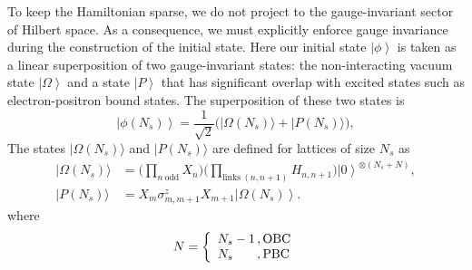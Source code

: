 \documentclass[twocolumn,superscriptaddress,showpacs,nofootinbib,notitlepage,preprintnumbers,secnumarabic,amssymb, floatfix, nobibnotes, aps, prd]{revtex4-2}
\newcommand{\ket}[1]{\left| #1 \right>} %
\begin{document}
To keep the Hamiltonian sparse, we do not project to the gauge-invariant sector of Hilbert space.  As a consequence, we must explicitly enforce gauge invariance during the construction of the initial state.
Here our initial state $\ket{\phi}$ is taken as a linear superposition of two gauge-invariant states: the non-interacting vacuum state $\ket{\Omega}$  and a state $\ket{P}$ that has significant overlap with excited states such as electron-positron bound states. The superposition of these two states is 
\begin{equation}
    \label{eq:initstate}
    \ket{\phi(N_s)} = \frac{1}{\sqrt{2}}\Big(|\Omega(N_s)\rangle + |P(N_s)\rangle\Big),
\end{equation}
The states $|\Omega(N_s)\rangle$ and $|P(N_s)\rangle$ are defined for lattices of size $N_s$ as
\begin{equation}
  \begin{split}
    \label{eq:compstates}
    |\Omega(N_s)\rangle &= \Big(\prod_{n\ \text{odd}}X_{n}\Big)\Big(\prod_{\text{links}\ (n,n+1)}H_{n,n+1}\Big)\ket{0}^{\otimes (N_s+N)},  \\
    |P(N_s)\rangle &= X_m\sigma^z_{m,m+1}X_{m+1}\ket{\Omega(N_s)}.
  \end{split}
\end{equation}
where
\begin{equation}
    N = \left\{
    \begin{array}{l@{\,,\,}l}
        N_{s} - 1 & \text{OBC} \\
        N_{s}     & \text{PBC}
    \end{array}
    \right.
\end{equation}
\end{document}
